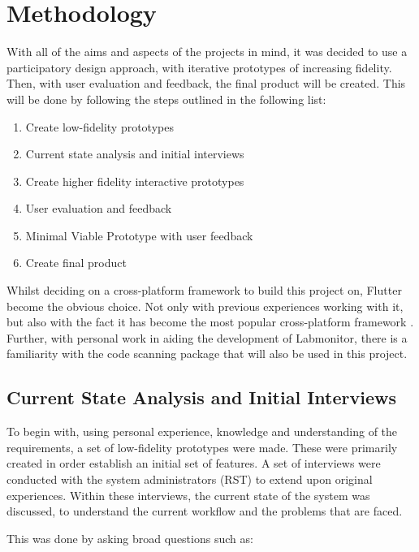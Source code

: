 \documentclass [11pt,a4paper]{article}
\begin{document}
\section{Methodology}
\label{sec:methodology}
With all of the aims and aspects of the projects in mind, it was decided to use a participatory design approach, with iterative prototypes of increasing fidelity. Then, with user evaluation and feedback, the final product will be created. This will be done by following the steps outlined in the following list:

\begin{enumerate}
    \item Create low-fidelity prototypes
    \item Current state analysis and initial interviews
    \item Create higher fidelity interactive prototypes
    \item User evaluation and feedback
    \item Minimal Viable Prototype with user feedback
    \item Create final product
\end{enumerate}

Whilst deciding on a cross-platform framework to build this project on, Flutter become the obvious choice. Not only with previous experiences working with it, but also with the fact it has become the most popular cross-platform framework \cite{JetBrainsFlutter}. Further, with personal work in aiding the development of Labmonitor\cite{labmonitor}, there is a familiarity with the code scanning package that will also be used in this project\cite{barcodeScannerPlugin}.

\subsection{Current State Analysis and Initial Interviews}
\label{sec:current_state_analysis}
To begin with, using personal experience, knowledge and  understanding of the requirements, a set of low-fidelity prototypes were made. These were primarily created in order establish an initial set of features. A set of interviews were conducted with the system administrators (RST) to extend upon original experiences.  Within these interviews, the current state of the system was discussed, to understand the current workflow and the problems that are faced.
\pagebreak

This was done by asking broad questions such as:
\end{document}
